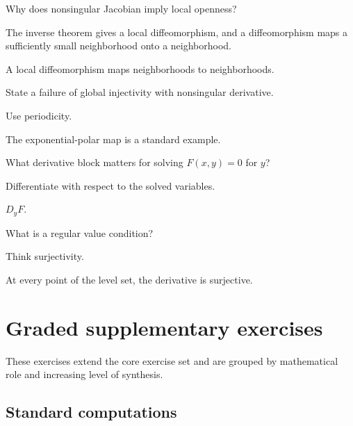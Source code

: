 \begin{exercise}\label{exr:ii09-05}
Why does nonsingular Jacobian imply local openness?
\end{exercise}
\begin{hint}
The inverse theorem gives a local diffeomorphism, and a diffeomorphism maps a sufficiently small neighborhood onto a neighborhood.
\end{hint}
\begin{solution}
A local diffeomorphism maps neighborhoods to neighborhoods.
\end{solution}

\begin{exercise}\label{exr:ii09-06}
State a failure of global injectivity with nonsingular derivative.
\end{exercise}
\begin{hint}
Use periodicity.
\end{hint}
\begin{solution}
The exponential-polar map is a standard example.
\end{solution}

\begin{exercise}\label{exr:ii09-07}
What derivative block matters for solving $F(x,y)=0$ for $y$?
\end{exercise}
\begin{hint}
Differentiate with respect to the solved variables.
\end{hint}
\begin{solution}
$D_yF$.
\end{solution}

\begin{exercise}\label{exr:ii09-08}
What is a regular value condition?
\end{exercise}
\begin{hint}
Think surjectivity.
\end{hint}
\begin{solution}
At every point of the level set, the derivative is surjective.
\end{solution}


\section{Graded supplementary exercises}
These exercises extend the core exercise set and are grouped by mathematical role and increasing level of synthesis.

\subsection*{Standard computations}

